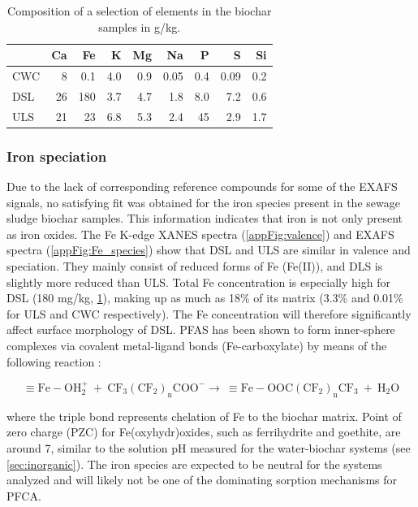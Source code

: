 \begin{table}
\centering
\caption{Composition of a selection of elements in the biochar samples in g/kg.}
\label{tab:BC_mainElements}
\begin{tabular}{lrrrrrrrr} \toprule
 & Ca & Fe & K & Mg & Na & P & S & Si \\ \midrule
CWC & 8 & 0.1 & 4.0 & 0.9 & 0.05 & 0.4 & 0.09 & 0.2 \\
DSL & 26 & 180 & 3.7 & 4.7 & 1.8 & 8.0 & 7.2 & 0.6 \\
ULS & 21 & 23 & 6.8 & 5.3 & 2.4 & 45 & 2.9 & 1.7 \\ \bottomrule
\end{tabular}
\end{table}

\subsubsection{Iron speciation\label{sec:Fe}}
Due to the lack of corresponding reference compounds for some of the EXAFS signals, no satisfying fit was obtained for the iron species present in the sewage sludge biochar samples. This information indicates that iron is not only present as iron oxides. The Fe K-edge XANES spectra (\cref{appFig:valence}) and EXAFS spectra (\cref{appFig:Fe_species}) show that DSL and ULS are similar in valence and speciation. They mainly consist of reduced forms of Fe (Fe(II)), and DLS is slightly more reduced than ULS. Total Fe concentration is especially high for DSL (180 mg/kg, \cref{tab:BC_mainElements}), making up as much as 18\% of its matrix (3.3\% and 0.01\% for ULS and CWC respectively). The Fe concentration will therefore significantly affect surface morphology of DSL. PFAS has been shown to form inner-sphere complexes via covalent metal-ligand bonds (Fe-carboxylate) by means of the following reaction \citep{du2014adsorption}:

\begin{equation}
    \mathrm{\equiv Fe-OH_2^+ ~ + ~ CF_3(CF_2)_nCOO^- \rightarrow ~ \equiv Fe-OOC(CF_2)_nCF_3 ~+~ H_2O}
\end{equation}

where the triple bond represents chelation of Fe to the biochar matrix. Point of zero charge (PZC) for Fe(oxyhydr)oxides, such as ferrihydrite and goethite, are around 7, similar to the solution pH measured for the water-biochar systems (see \cref{sec:inorganic}). The iron species are expected to be neutral for the systems analyzed and will likely not be one of the dominating sorption mechanisms for PFCA. 

